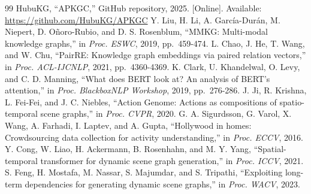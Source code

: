 \documentclass[conference,a4paper]{IEEEtran}
\begin{document}
\begin{thebibliography}{99}
 HubuKG, ``APKGC,'' GitHub repository, 2025. [Online]. Available: \url{https://github.com/HubuKG/APKGC}
 Y. Liu, H. Li, A. García-Durán, M. Niepert, D. Oñoro-Rubio, and D. S. Rosenblum, ``MMKG: Multi-modal knowledge graphs,'' in \emph{Proc. ESWC}, 2019, pp.~459-474.
 L. Chao, J. He, T. Wang, and W. Chu, ``PairRE: Knowledge graph embeddings via paired relation vectors,'' in \emph{Proc. ACL-IJCNLP}, 2021, pp.~4360-4369.
 K. Clark, U. Khandelwal, O. Levy, and C. D. Manning, ``What does BERT look at? An analysis of BERT's attention,'' in \emph{Proc. BlackboxNLP Workshop}, 2019, pp.~276-286.
 J. Ji, R. Krishna, L. Fei-Fei, and J. C. Niebles, ``Action Genome: Actions as compositions of spatio-temporal scene graphs,'' in \emph{Proc. CVPR}, 2020.
 G. A. Sigurdsson, G. Varol, X. Wang, A. Farhadi, I. Laptev, and A. Gupta, ``Hollywood in homes: Crowdsourcing data collection for activity understanding,'' in \emph{Proc. ECCV}, 2016.
 Y. Cong, W. Liao, H. Ackermann, B. Rosenhahn, and M. Y. Yang, ``Spatial-temporal transformer for dynamic scene graph generation,'' in \emph{Proc. ICCV}, 2021.
 S. Feng, H. Mostafa, M. Nassar, S. Majumdar, and S. Tripathi, ``Exploiting long-term dependencies for generating dynamic scene graphs,'' in \emph{Proc. WACV}, 2023.
\end{thebibliography}
\end{document}
